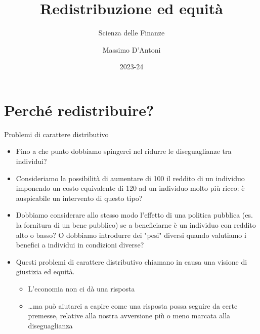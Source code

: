 \documentclass[11pt]{beamer}
\institute{Università di Siena}
\author{Massimo D'Antoni}
\date{2023-24}
\title{Redistribuzione ed equità}
\subtitle{Scienza delle Finanze}
\begin{document}
\maketitle

\section{Perché redistribuire?}


\begin{frame}{Problemi di carattere distributivo}
\begin{itemize}
\item Fino a che punto dobbiamo spingerci nel ridurre le diseguaglianze tra
individui?
\item Consideriamo la possibilità di aumentare di 100 il reddito di un individuo
imponendo un costo equivalente di 120 ad un individuo molto più ricco: è
auspicabile un intervento di questo tipo?
\item Dobbiamo considerare allo stesso modo l'effetto di una politica pubblica
(es. la fornitura di un bene pubblico) se a beneficiarne è un individuo con
reddito alto o basso? O dobbiamo introdurre dei "pesi" diversi quando
valutiamo i benefici a individui in condizioni diverse?
\item Questi problemi di carattere \alert{distributivo} chiamano in causa una visione di
giustizia ed equità.
\begin{itemize}
\item L'economia non ci dà una risposta
\item \ldots{}ma può aiutarci a capire come una risposta possa seguire da certe
premesse, relative alla nostra avversione più o meno marcata alla
diseguaglianza
\end{itemize}
\end{itemize}
\end{frame}
\end{document}
